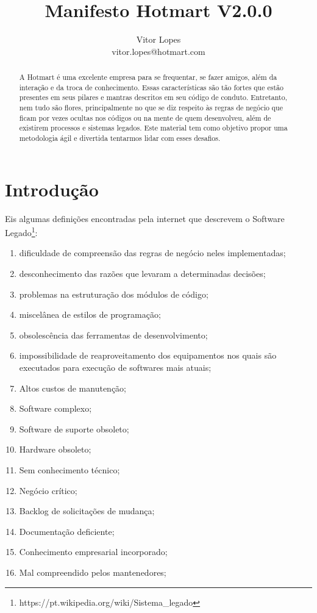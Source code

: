 \documentclass[a4paper]{article}
\title{\textbf{Manifesto Hotmart V2.0.0}}
\author{Vitor Lopes \\ vitor.lopes@hotmart.com}
\begin{document}
\maketitle
\begin{abstract}
    A Hotmart é uma excelente empresa para se frequentar, se fazer amigos, além da interação e da troca de conhecimento. Essas características são tão fortes que estão presentes em seus pilares e mantras descritos em  seu código de conduto. Entretanto, nem tudo são flores, principalmente no que se diz respeito às regras de negócio que ficam por vezes ocultas nos códigos ou na mente de quem desenvolveu, além de existirem processos e sistemas legados. Este material tem como objetivo propor uma metodologia ágil e divertida tentarmos lidar com esses desafios.
\end{abstract}
\section{Introdução}
Eis algumas definições encontradas pela internet que descrevem o Software Legado\footnote{https://pt.wikipedia.org/wiki/Sistema\_legado}:
\begin{enumerate}
    \item dificuldade de compreensão das regras de negócio neles implementadas;
    \item desconhecimento das razões que levaram a determinadas decisões;
    \item problemas na estruturação dos módulos de código;
    \item miscelânea de estilos de programação;
    \item obsolescência das ferramentas de desenvolvimento;
    \item impossibilidade de reaproveitamento dos equipamentos nos quais são executados para execução de softwares mais atuais;
    \item Altos custos de manutenção;
    \item Software complexo;
    \item Software de suporte obsoleto;
    \item Hardware obsoleto;
    \item Sem conhecimento técnico;
    \item Negócio crítico;
    \item Backlog de solicitações de mudança;
    \item Documentação deficiente;
    \item Conhecimento empresarial incorporado;
    \item Mal compreendido pelos mantenedores;
\end{enumerate}
\end{document}
